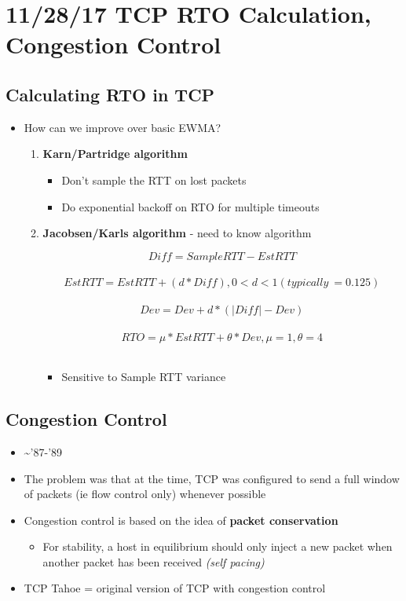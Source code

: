 \documentclass[11pt]{article}
\begin{document}
\section{11/28/17 TCP RTO Calculation, Congestion Control}
\label{sec:orgheadline138}

\subsection{Calculating RTO in TCP}
\label{sec:orgheadline135}
\begin{itemize}
\item How can we improve over basic EWMA?
\begin{enumerate}
\item \textbf{Karn/Partridge algorithm}
\begin{itemize}
\item Don't sample the RTT on lost packets
\item Do exponential backoff on RTO for multiple timeouts
\end{itemize}
\item \textbf{Jacobsen/Karls algorithm} - need to know algorithm

\[Diff = SampleRTT - EstRTT\] \\
\[EstRTT = EstRTT + (d*Diff), 0 < d < 1 (typically ~= 0.125)\] \\
\[Dev = Dev + d * (|Diff| - Dev)\] \\
\[RTO = \mu * EstRTT + \theta * Dev, \mu=1, \theta=4\] \\

\begin{itemize}
\item Sensitive to Sample RTT variance
\end{itemize}
\end{enumerate}
\end{itemize}

\subsection{Congestion Control}
\label{sec:orgheadline137}
\begin{itemize}
\item \textasciitilde{}'87-'89
\item The problem was that at the time, TCP was configured to send a full
window of packets (ie flow control only) whenever possible
\item Congestion control is based on the idea of \textbf{packet conservation}
\begin{itemize}
\item For stability, a host in equilibrium should only inject a new
packet when another packet has been received \emph{(self pacing)}
\end{itemize}
\item TCP Tahoe = original version of TCP with congestion control
\end{itemize}
\end{document}
